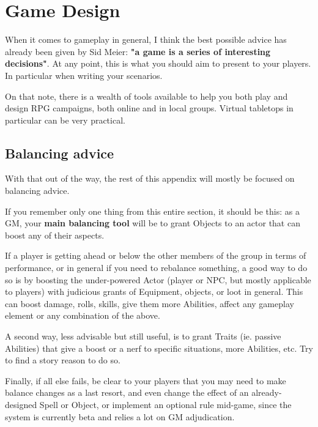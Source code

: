 
\chapter{Game Design}

When it comes to gameplay in general, I think the best possible advice has already been given by Sid Meier: \textbf{"a game is a series of interesting decisions"}. At any point, this is what you should aim to present to your players. In particular when writing your scenarios.

On that note, there is a wealth of tools available to help you both play and design RPG campaigns, both online and in local groups. Virtual tabletops in particular can be very practical.


\section{Balancing advice}


With that out of the way, the rest of this appendix will mostly be focused on balancing advice.

\begin{rpg-examplebox}
    If you remember only one thing from this entire section, it should be this: as a GM, your \textbf{main balancing tool} will be to grant Objects to an actor that can boost any of their aspects.
\end{rpg-examplebox}

If a player is getting ahead or below the other members of the group in terms of performance, or in general if you need to rebalance something, a good way to do so is by boosting the under-powered Actor (player or NPC, but mostly applicable to players) with judicious grants of Equipment, objects, or loot in general. This can boost damage, rolls, skills, give them more Abilities, affect any gameplay element or any combination of the above.
    
A second way, less advisable but still useful, is to grant Traits (ie. passive Abilities) that give a boost or a nerf to specific situations, more Abilities, etc. Try to find a story reason to do so.
    
Finally, if all else fails, be clear to your players that you may need to make balance changes as a last resort, and even change the effect of an already-designed Spell or Object, or implement an optional rule mid-game, since the system is currently beta and relies a lot on GM adjudication.

